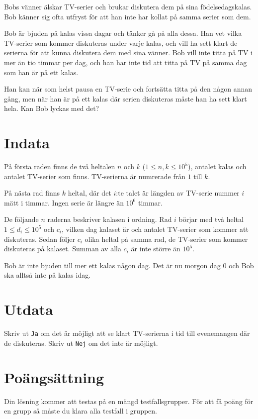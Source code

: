 Bobs vänner älskar TV-serier och brukar diskutera dem på sina födelsedagskalas. Bob känner sig ofta utfryst för att han inte har kollat på samma serier som dem.

Bob är bjuden på kalas vissa dagar och tänker gå på alla dessa. Han vet vilka TV-serier som kommer diskuteras under varje kalas, och vill ha sett klart de serierna för att kunna diskutera dem med sina vänner. Bob vill inte titta på TV i mer än tio timmar per dag, och han har inte tid att titta på TV på samma dag som han är på ett kalas.

Han kan när som helst pausa en TV-serie och fortsätta titta på den någon annan gång, men när han är på ett kalas där serien diskuteras måste han ha sett klart hela. Kan Bob lyckas med det?

\section*{Indata}
På första raden finns de två heltalen $n$ och $k$ ($1 \leq n,k \leq 10^5$), antalet kalas och antalet TV-serier som finns. TV-serierna är numrerade från $1$ till $k$.

På nästa rad finns $k$ heltal, där det $i$:te talet är längden av TV-serie nummer $i$ mätt i timmar. Ingen serie är längre än $10^6$ timmar.

De följande $n$ raderna beskriver kalasen i ordning. Rad $i$ börjar med två heltal $1 \leq d_i \leq 10^5$ och $c_i$, vilken dag kalaset är och antalet TV-serier som kommer att diskuteras. Sedan följer $c_i$ olika heltal på samma rad, de TV-serier som kommer diskuteras på kalaset. Summan av alla $c_i$ är inte större än $10^5$.

Bob är inte bjuden till mer ett kalas någon dag. Det är nu morgon dag $0$ och Bob ska alltså inte på kalas idag.

\section*{Utdata}
Skriv ut \texttt{Ja} om det är möjligt att se klart TV-serierna i tid till evenemangen där de diskuteras. Skriv ut \texttt{Nej} om det inte är möjligt.

\section*{Poängsättning}
Din lösning kommer att testas på en mängd testfallsgrupper.
För att få poäng för en grupp så måste du klara alla testfall i gruppen.

